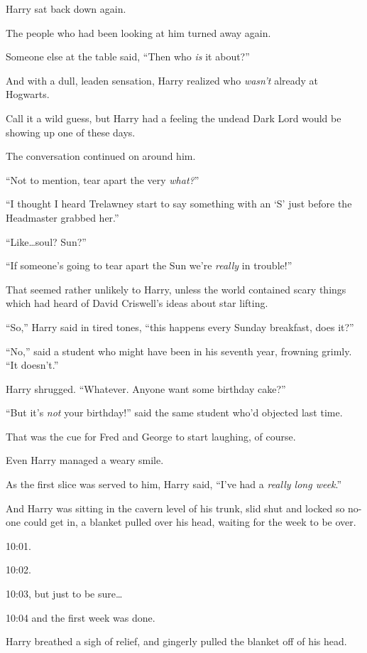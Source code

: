 Harry sat back down again.

The people who had been looking at him turned away again.

Someone else at the table said, “Then who \emph{is} it about?”

And with a dull, leaden sensation, Harry realized who \emph{wasn’t} already at Hogwarts.

Call it a wild guess, but Harry had a feeling the undead Dark Lord would be showing up one of these days.

The conversation continued on around him.

“Not to mention, tear apart the very \emph{what?}”

“I thought I heard Trelawney start to say something with an ‘S’ just before the Headmaster grabbed her.”

“Like…soul? Sun?”

“If someone’s going to tear apart the Sun we’re \emph{really} in trouble!”

That seemed rather unlikely to Harry, unless the world contained scary things which had heard of David Criswell’s ideas about star lifting.

“So,” Harry said in tired tones, “this happens every Sunday breakfast, does it?”

“No,” said a student who might have been in his seventh year, frowning grimly. “It doesn’t.”

Harry shrugged. “Whatever. Anyone want some birthday cake?”

“But it’s \emph{not} your birthday!” said the same student who’d objected last time.

That was the cue for Fred and George to start laughing, of course.

Even Harry managed a weary smile.

As the first slice was served to him, Harry said, “I’ve had a \emph{really long week}.”

\later

And Harry was sitting in the cavern level of his trunk, slid shut and locked so no-one could get in, a blanket pulled over his head, waiting for the week to be over.

10:01.

10:02.

10:03, but just to be sure…

10:04 and the first week was done.

Harry breathed a sigh of relief, and gingerly pulled the blanket off of his head.

